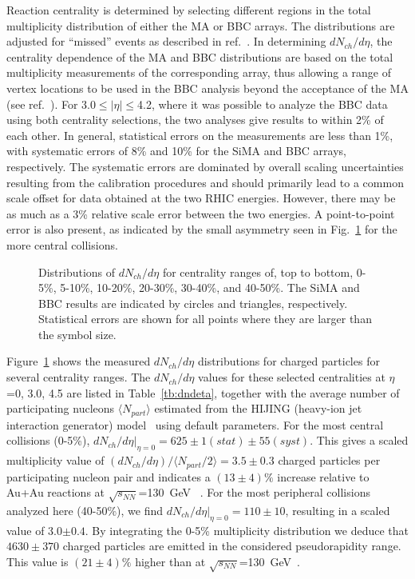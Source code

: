\documentclass[preprint,showpacs,preprintnumbers,amsmath,amssymb]{revtex4}
\begin{document}
Reaction centrality is determined by selecting different regions 
in the total multiplicity distribution of either the MA or BBC arrays. 
The distributions are adjusted for ``missed'' events as
described in ref.~\cite{bearden01a}.
In determining $dN_{ch}/d\eta$, the centrality dependence 
of the MA and BBC distributions are based on the total multiplicity  
measurements of the corresponding array, thus allowing 
a range of vertex locations to be used in the BBC analysis 
beyond the acceptance of the MA (see ref.~\cite{bearden01a}). 
For
3.0$\le|\eta|\le$4.2, where it was possible to analyze the BBC data
using both centrality selections, the two analyses give
results to within 2\% of each other. In general, statistical errors on
the measurements are less than 1\%, with 
systematic errors of 8\% and 10\% for the SiMA and BBC arrays,
respectively. The systematic errors are dominated by overall scaling 
uncertainties resulting from the calibration procedures 
and should primarily lead  to a common
scale offset for data obtained at the two RHIC energies. 
However, there may
be as much as a 3\% relative scale error between the two energies. 
A point-to-point error is 
also present, as indicated by the small asymmetry seen in Fig.~\ref{dndeta} 
for the more central collisions. 

\begin{figure}
  \caption{
    Distributions of $dN_{ch}/d\eta$ for centrality ranges of, top to
    bottom, 0-5\%, 5-10\%, 10-20\%, 20-30\%, 30-40\%, and 40-50\%.
    The SiMA and BBC results are indicated by circles and
    triangles, respectively. Statistical errors are shown for all
    points where they are larger than the symbol size.}
  \label{dndeta}
\end{figure}


Figure~\ref{dndeta} shows the measured $dN_{ch}/d\eta$
distributions for charged particles for several centrality ranges.  
The
$dN_{ch}/d\eta$ values for these selected centralities 
at $\eta$=0, 3.0, 4.5 are listed
in Table~\ref{tb:dndeta}, together with the average number of participating
nucleons $\langle N_{part}\rangle$ 
estimated from the HIJING (heavy-ion jet interaction generator) model~\cite{wang91} 
using default parameters.  For the most central collisions (0-5\%), 
$dN_{ch}/d\eta |_{\eta = 0}=625\pm 1(stat)\pm 55(syst)$. 
This gives a scaled multiplicity value of
$(dN_{ch}/d\eta)/\langle N_{part}/2\rangle= 
3.5 \pm 0.3$ charged particles per
participating nucleon 
pair and indicates a
$(13\pm 4)\%$ increase 
relative to Au+Au reactions at
$\sqrt{s_{NN}}$=130~GeV
~\cite{bearden01a,sionly}. 
For
the most peripheral collisions analyzed here (40-50\%),
we find
$dN_{ch}/d\eta |_{\eta =0}=110\pm 10$, resulting in a 
scaled value of 3.0$\pm 0.4$. 
By integrating the 0-5\% multiplicity distribution we deduce that $4630
\pm 370$ charged particles are emitted in the considered pseudorapidity
range.  This value is $(21\pm 4)\%$ higher than at
$\sqrt{s_{NN}}$=130~GeV~\cite{bearden01a}.   
\end{document}
